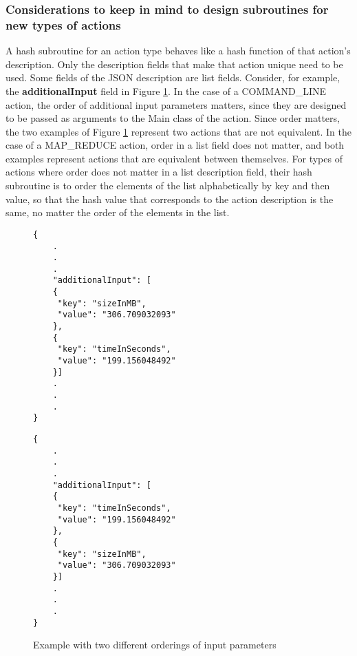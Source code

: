 \subsubsection{Considerations to keep in mind to design subroutines for new types of actions}
A hash subroutine for an action type behaves like a hash function of that action's description.  Only the description fields that make that action unique need to be used.  Some fields of the JSON description are list fields.  Consider, for example, the \textbf{additionalInput} field in Figure \ref{fig:action_parameters_ordering}.  In the case of a COMMAND\_LINE action, the order of additional input parameters matters, since they are designed to be passed as arguments to the Main class of the action.  Since order matters, the two examples of Figure \ref{fig:action_parameters_ordering} represent two actions that are not equivalent. In the case of a MAP\_REDUCE action, order in a list field does not matter, and both examples represent actions that are equivalent between themselves. For types of actions where order does not matter in a list description field, their hash subroutine is to order the elements of the list alphabetically by key and then value, so that the hash value that corresponds to the action description is the same, no matter the order of the elements in the list.

\begin{figure}[htbp]
\centering
\begin{singlespace}
\begin{minipage}[b]{7 cm}
\begin{mdframed}
\begin{verbatim}
{
    .
    .
    .
    "additionalInput": [
    {
     "key": "sizeInMB",
     "value": "306.709032093"
    }, 
    {
     "key": "timeInSeconds", 
     "value": "199.156048492"
    }]
    .
    .
    .
}
\end{verbatim}
\end{mdframed}
\end{minipage}
\begin{minipage}[b]{7 cm}
\begin{mdframed}
\begin{verbatim}
{
    .
    .
    .
    "additionalInput": [
    {
     "key": "timeInSeconds", 
     "value": "199.156048492"
    },
    {
     "key": "sizeInMB",
     "value": "306.709032093"
    }]
    .
    .
    .
}
\end{verbatim}
\end{mdframed}
\end{minipage}
\end{singlespace}
\caption{Example with two different orderings of input parameters}
\label{fig:action_parameters_ordering}
\end{figure}



